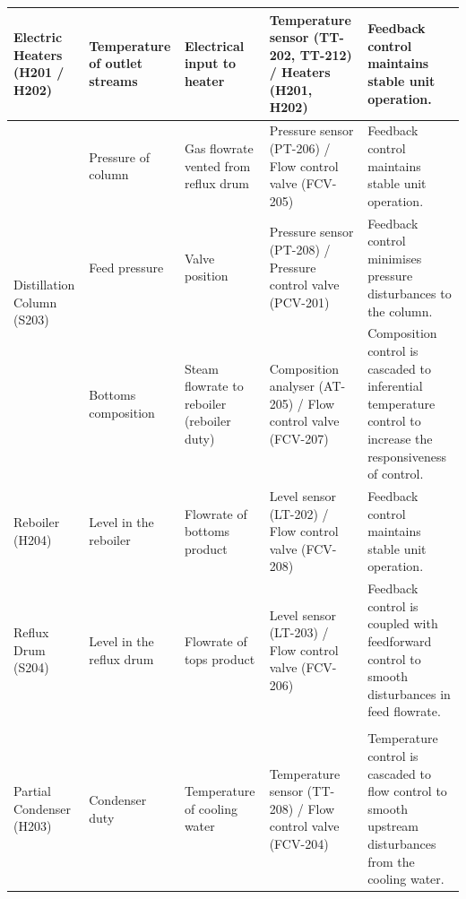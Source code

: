 \begin{table}[h]
{\begin{tabular}{p{3cm}|p{3cm}|p{4cm}|p{5cm}|p{6cm}}
                                                                                        \midrule
Electric Heaters (H201 / H202)              & Temperature of outlet streams               & Electrical input to heater                              & Temperature sensor (TT-202, TT-212) / Heaters (H201, H202)                 & Feedback control maintains stable unit operation.                                                                                    \\ \midrule
\multirow{3}{*}{Distillation Column (S203)}
                                            & Pressure of column        & Gas   flowrate vented from reflux drum & Pressure   sensor (PT-206) / Flow control valve (FCV-205) & Feedback   control maintains stable unit operation.                                                                \\
                                            & Feed   pressure                             & Valve position                                          & Pressure sensor (PT-208) / Pressure control valve (PCV-201)                & Feedback control minimises pressure disturbances to the column.\\
                                           & Bottoms composition                         & Steam flowrate to reboiler (reboiler duty)              & Composition analyser (AT-205) / Flow control valve (FCV-207)               & Composition control is cascaded to inferential temperature control to   increase the responsiveness of control.                      \\\midrule
Reboiler (H204)                             & Level in the reboiler                       & Flowrate of bottoms product                             & Level sensor (LT-202) / Flow control valve (FCV-208)                       & Feedback control maintains stable unit operation.                                                                                    \\ \midrule
Reflux Drum (S204)        & Level in   the reflux drum & Flowrate   of tops product            & Level   sensor (LT-203) / Flow control valve (FCV-206)   & Feedback   control is coupled with feedforward control to smooth disturbances in feed flowrate.                   \\
                                            &                                             &                                                         &                                                                            &                                                                                                                                      \\ \midrule
Partial Condenser (H203)                    & Condenser duty                              & Temperature of cooling water                            & Temperature sensor (TT-208) / Flow control valve (FCV-204)                 & Temperature control is cascaded to flow control to smooth upstream   disturbances from the cooling water.                            \\ \bottomrule
\end{tabular}}
\end{table}


